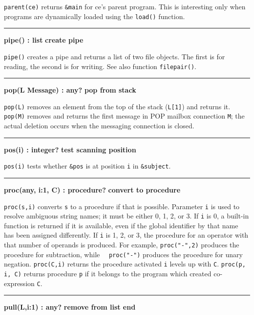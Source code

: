 \noindent
\texttt{parent(ce)} returns \texttt{\&main} for ce's
parent program. This is interesting only when programs are dynamically
loaded using the \texttt{load()} function.

\bigskip\hrule\vspace{0.1cm}
\noindent
{\bf pipe() : list } \hfill {\bf create pipe}

\noindent
{}\texttt{pipe()} creates a pipe and returns a list of two
file objects. The first is for reading, the second is for writing. See
also function \texttt{filepair()}.

\bigskip\hrule\vspace{0.1cm}
\noindent
{\bf pop(L {\textbar} Message) : any? } \hfill {\bf pop from stack}\WarningNotThreadSafe

\noindent
{}\texttt{pop(L)} removes an element from the top of the
stack (\texttt{L[1]}) and returns it. \texttt{pop(M)}
removes and returns the first message in POP mailbox connection \texttt{M};
the actual deletion occurs when the messaging connection is closed.

\bigskip\hrule\vspace{0.1cm}
\noindent
{\bf pos(i) : integer? } \hfill {\bf test scanning position}

\noindent
{}\texttt{pos(i)} tests whether \texttt{\&pos} is at
position \texttt{i} in \texttt{\&subject}.

\bigskip\hrule\vspace{0.1cm}
\noindent
{\bf proc(any, i:1, C) : procedure? } \hfill {\bf convert to procedure}

\noindent
{}\texttt{proc(s,i)} converts \texttt{s} to a procedure
if that is possible. Parameter \texttt{i} is used to resolve ambiguous
string names; it must be either 0, 1, 2, or 3. If \texttt{i} is 0, a
built-in function is returned if it is available, even if the global
identifier by that name has been assigned differently. If \texttt{i} is
1, 2, or 3, the procedure for an operator with that number of operands
is produced. For example,
\texttt{proc("-",2)} produces the procedure
for subtraction, while
\ \ \texttt{proc("-")} produces the
procedure for unary negation. \texttt{proc(C,i)} returns the procedure
activated \texttt{i} levels up with \texttt{C}. \texttt{proc(p, i, C)}
returns procedure \texttt{p} if it belongs to the program which created
co-expression \texttt{C}.

\bigskip\hrule\vspace{0.1cm}
\noindent
{\bf pull(L,i:1) : any? } \hfill {\bf remove from list end}\WarningNotThreadSafe

